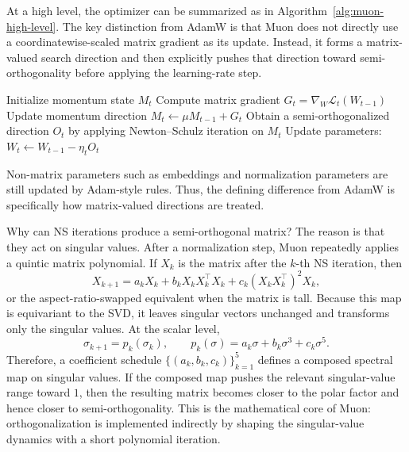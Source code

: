 \documentclass[10pt]{article}
\begin{document}
At a high level, the optimizer can be summarized as in Algorithm~\ref{alg:muon-high-level}. The key distinction from AdamW is that Muon does not directly use a coordinatewise-scaled matrix gradient as its update. Instead, it forms a matrix-valued search direction and then explicitly pushes that direction toward semi-orthogonality before applying the learning-rate step.

\begin{algorithm}[t]
\caption{High-level Muon update for a matrix parameter}
\label{alg:muon-high-level}
\small
\begin{algorithmic}[1]
\State Initialize momentum state $M_t$
    \State Compute matrix gradient $G_t=\nabla_W \mathcal{L}_t(W_{t-1})$
    \State Update momentum direction $M_t \leftarrow \mu M_{t-1} + G_t$
    \State Obtain a semi-orthogonalized direction $O_t$ by applying Newton--Schulz iteration on $M_t$
    \State Update parameters: $W_t \leftarrow W_{t-1} - \eta_t O_t$
\EndFor
\end{algorithmic}
\end{algorithm}

Non-matrix parameters such as embeddings and normalization parameters are still updated by Adam-style rules. Thus, the defining difference from AdamW is specifically how matrix-valued directions are treated.

Why can NS iterations produce a semi-orthogonal matrix? The reason is that they act on singular values. After a normalization step, Muon repeatedly applies a quintic matrix polynomial. If $X_k$ is the matrix after the $k$-th NS iteration, then
\begin{equation}
    X_{k+1} = a_k X_k + b_k X_k X_k^\top X_k + c_k (X_k X_k^\top)^2 X_k,
\end{equation}
or the aspect-ratio-swapped equivalent when the matrix is tall. Because this map is equivariant to the SVD, it leaves singular vectors unchanged and transforms only the singular values. At the scalar level,
\begin{equation}
    \sigma_{k+1} = p_k(\sigma_k), \qquad
    p_k(\sigma)=a_k \sigma + b_k \sigma^3 + c_k \sigma^5.
\end{equation}
Therefore, a coefficient schedule $\{(a_k,b_k,c_k)\}_{k=1}^5$ defines a composed spectral map on singular values. If the composed map pushes the relevant singular-value range toward $1$, then the resulting matrix becomes closer to the polar factor and hence closer to semi-orthogonality. This is the mathematical core of Muon: orthogonalization is implemented indirectly by shaping the singular-value dynamics with a short polynomial iteration.
\end{document}
